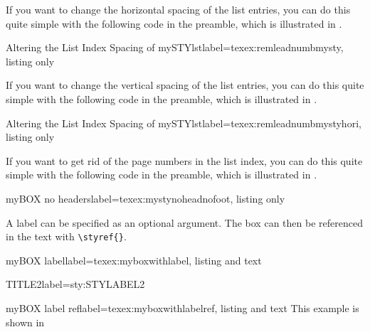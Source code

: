 \documentclass[]{myHOWTO-V001}
\begin{document}
If you want to change the horizontal spacing of the list entries, you can do this quite simple with the following code in the preamble, which is illustrated in .

\begin{myTEXEXdoclst}{Altering the List Index Spacing of mySTYlst}{label={texex:remleadnumbmysty}, listing only}
\makeatletter
	\renewcommand{\l@mySTY}{\@dottedtocline{1}{0mm}{0mm}}
\makeatother
\end{myTEXEXdoclst}

If you want to change the vertical spacing of the list entries, you can do this quite simple with the following code in the preamble, which is illustrated in .

\begin{myTEXEXdoclst}{Altering the List Index Spacing of mySTYlst}{label={texex:remleadnumbmystyhori}, listing only}
\makeatletter
\makeatother
\end{myTEXEXdoclst}

If you want to get rid of the page numbers in the list index, you can do this quite simple with the following code in the preamble, which is illustrated in .

\begin{myTEXEXdoclst}{myBOX no headers}{label={texex:mystynoheadnofoot}, listing only}
\let\oldlistofmySTY\listofmySTY

\renewcommand\listofmySTY
{
	\pagestyle{empty} %
	\oldlistofmySTY %
	\clearpage %
	\pagestyle{plain} %
}
\end{myTEXEXdoclst}

A label can be specified as an optional argument. The box can then be referenced in the text with \Verb|\styref{}|.

\begin{myTEXEXdoclst}{myBOX label}{label={texex:myboxwithlabel}, listing and text}
\begin{mySTYlst}{TITLE2}{label={sty:STYLABEL2}}
\lipsum[4]
\end{mySTYlst}
\end{myTEXEXdoclst}

\begin{myTEXEXdoclst}{myBOX label ref}{label={texex:myboxwithlabelref}, listing and text}
This example is shown in 
\end{myTEXEXdoclst}
\end{document}
